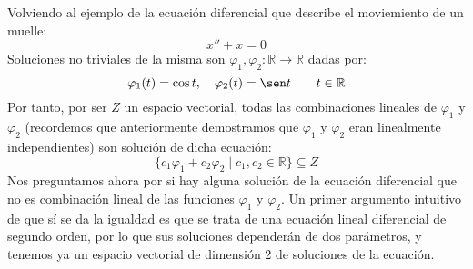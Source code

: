 \begin{ejemplo}
    Volviendo al ejemplo de la ecuación diferencial que describe el moviemiento de un muelle:
    \begin{equation*}
        x'' + x = 0
    \end{equation*}
    Soluciones no triviales de la misma son $\varphi_1,\varphi_2:\mathbb{R}\rightarrow\mathbb{R}$ dadas por:
    \begin{equation*}
        \varphi_1(t) = \cos t, \quad \varphi_2(t) = \sen t  \qquad t\in \mathbb{R}
    \end{equation*}
    Por tanto, por ser $Z$ un espacio vectorial, todas las combinaciones lineales de $\varphi_1$ y $\varphi_2$ (recordemos que anteriormente demostramos que $\varphi_1$ y $\varphi_2$ eran linealmente independientes) son solución de dicha ecuación:
    \begin{equation*}
        \{c_1\varphi_1 + c_2\varphi_2 \mid c_1,c_2\in \mathbb{R}\} \subseteq Z
    \end{equation*}
    Nos preguntamos ahora por si hay alguna solución de la ecuación diferencial que no es combinación lineal de las funciones $\varphi_1$ y $\varphi_2$. Un primer argumento intuitivo de que sí se da la igualdad es que se trata de una ecuación lineal diferencial de segundo orden, por lo que sus soluciones dependerán de dos parámetros, y tenemos ya un espacio vectorial de dimensión 2 de soluciones de la ecuación.
\end{ejemplo}

